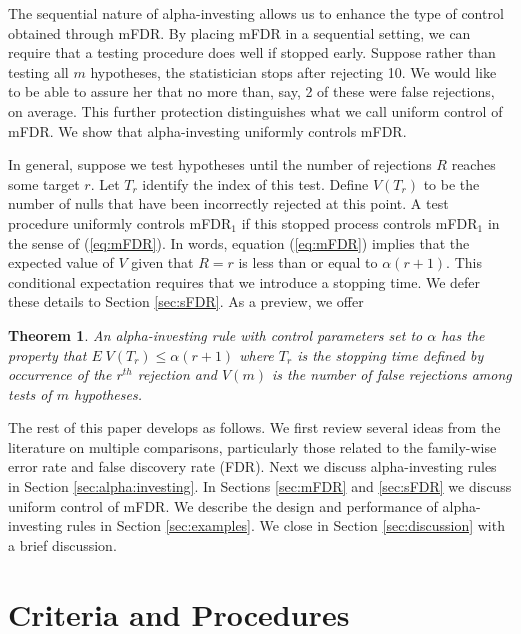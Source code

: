 \documentclass[12pt]{article}
\newtheorem{theorem}{Theorem}
\begin{document}
The sequential nature of alpha-investing allows us to enhance the
 type of control obtained through mFDR.  By placing mFDR in a sequential setting, we can require that a testing procedure does well if stopped early.  
 Suppose rather than testing all
 $m$ hypotheses, the statistician stops after rejecting 10.
  We would like to be able to assure her that no more than, say, 2 of
 these were false rejections, on average.  This further protection  distinguishes
 what we call uniform control of mFDR. We show that alpha-investing uniformly controls
 mFDR.  
 
 In general,
suppose we test hypotheses until the number of rejections $R$
reaches some target $r$.  Let $T_{r}$ identify the index of this test.
Define $V(T_{r})$ to be the number of nulls that have been incorrectly
rejected at this point. A test procedure uniformly controls
mFDR${}_{1}$ if this stopped process controls mFDR${}_{1}$ in the
sense of (\ref{eq:mFDR}). In words, equation (\ref{eq:mFDR}) implies
that the expected value of $V$ given that $R=r$ is less than or
equal to $\alpha(r+1)$.  This conditional expectation requires that we
introduce a stopping time.  We defer these details to Section \ref{sec:sFDR}.  As a
preview, we offer
\begin{theorem}\label{thm:stopped}
An alpha-investing rule with control parameters set to $\alpha$ has
 the property that $E \; V(T_{r}) \le \alpha(r+1)$ where $T_{r}$ is
 the stopping time defined by occurrence of the $r^{th}$ rejection and
 $V(m)$ is the number of false rejections among tests of $m$ hypotheses.
\end{theorem}

The rest of this paper develops as follows.  We first review several
 ideas from the literature on multiple comparisons, particularly those
 related to the family-wise error rate and false discovery rate (FDR).  
 Next we discuss alpha-investing rules in Section \ref{sec:alpha:investing}.  In
 Sections \ref{sec:mFDR} and \ref{sec:sFDR} we discuss uniform control
 of mFDR.  We describe the design and performance of
 alpha-investing rules  in Section
 \ref{sec:examples}.  We close in Section \ref{sec:discussion} with a
 brief discussion. 


\section{Criteria and Procedures }  \label{sec:procedure} %
\end{document}

